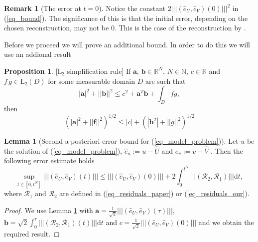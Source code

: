 \documentclass[12pt,a4paper]{article}
\numberwithin{equation}{section}
\theoremstyle{definition}
\newcommand{\pnorm}[1]{\left|\left|\left|#1\right|\right|\right|}
\newcommand{\norm}[1]{\left|#1\right|}
\newcommand{\Norm}[1]{\left|\left|#1\right|\right|}
\newcommand{\vect}[1]{\textbf{#1}}
\newcommand{\leb}{\text{L}}
\newcommand{\qp}[1]{\left(#1\right)}
\newcommand{\qb}[1]{\left[#1\right]}
\newcommand{\rec}[1]{\widehat{{#1}}}
\newtheorem{Proposition}[subsection]{Proposition}
\newtheorem{Lemma}[subsection]{Lemma}
\newtheorem{Rem}[subsection]{Remark}
\begin{document}
\begin{Rem}[The error at $t=0$]
	Notice the constant $2\pnorm{\qp{\hat{e}_U,\hat{e}_V}\qp{0}}^2$ in (\ref{eq_bound}).  The significance of this is that the initial error, depending on the chosen reconstruction, may not be $0$.  This is the case of the reconstruction by \cite{georgoulis2016posteriori}.
\end{Rem}

Before we proceed we will prove an additional bound.  In order to do this we will use an addional result
\begin{Proposition}\label{lemma:L2_simplification}[$\leb_2$ simplification rule] If $\vect{a},\, \vect{b}\in \mathbb{R}^N,\, N\in \mathbb{N}$, $c\in \mathbb{R}$ and $f\,g \in \leb_2\qp{D}$ for some measurable domain $D$ are such that 
	\begin{equation*}
\norm{\vect{a}}^2 +\Norm{\vect{b}}^2\leq c^2+\vect{a}^T\vect{b}+\int_D fg,
 	\end{equation*}
then
\begin{equation}
\qp{\norm{\vect{a}}^2 +\Norm{\vect{f}}^2}^{1/2}\leq \norm{c}+\qp{\norm{\vect{b}^2}+\Norm{g}^2}^{1/2}
\end{equation}
\end{Proposition}

\begin{Lemma}[Second a-posteriori error bound for (\ref{eq_model_problem})]
	Let $u$ be the solution of (\ref{eq_model_problem}), $\hat{e}_u:=u-\rec{U}$ and $\hat{e}_v:=v-\rec{V}$ .  Then the following error estimate holds
	\begin{equation}\label{eq_bound_2}
	\sup_{t\in\qb{0,t^N}}\pnorm{\qp{\hat{e}_U,\hat{e}_V}\qp{t}}\leq
	\pnorm{\qp{\hat{e}_U,\hat{e}_V}\qp{0}}+
	2{\int_0^{t^N}\pnorm{\qp{\mathcal{R}_2,\mathcal{R}_1}}\mathrm{d}t},
	\end{equation}
	where $\mathcal{R}_1$ and $\mathcal{R}_2$ are defined in (\ref{eq_residuals_paper}) or (\ref{eq_residuals_our}).
\end{Lemma}
\begin{proof}
We use  Lemma  \ref{lemma:L2_simplification} with $\vect{a}=\frac{1}{\sqrt{2}}\pnorm{\qp{\hat{e}_U, \hat{e}_V}\qp{\tau}}$, $\vect{b}=\sqrt{2}\int_0^\tau\pnorm{\qp{\mathcal{R}_2,\mathcal{R}_1}\qp{t}} \mathrm{d}t$ and $c = \frac{1}{\sqrt{2}}\pnorm{\qp{\hat{e}_U, \hat{e}_V}\qp{0}}$ and we obtain the required result.
\end{proof}
\end{document}
